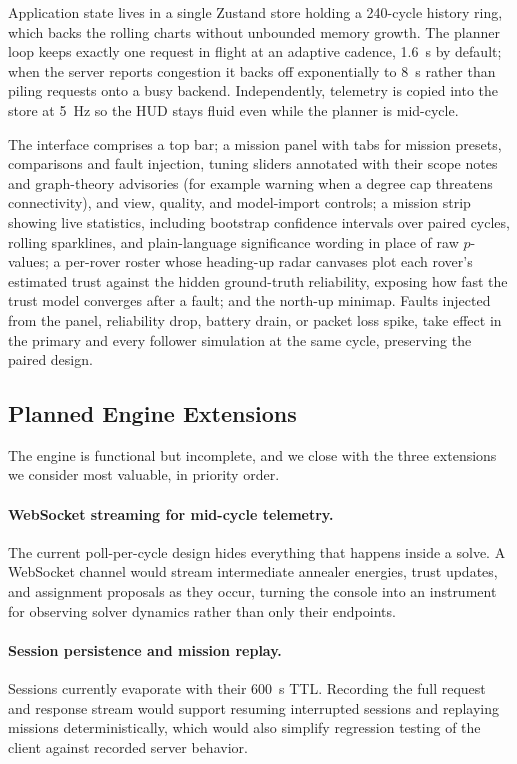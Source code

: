 Application state lives in a single Zustand store holding a 240-cycle
history ring, which backs the rolling charts without unbounded memory
growth. The planner loop keeps exactly one request in flight at an
adaptive cadence, 1.6~s by default; when the server reports congestion it
backs off exponentially to 8~s rather than piling requests onto a busy
backend. Independently, telemetry is copied into the store at 5~Hz so the
HUD stays fluid even while the planner is mid-cycle.

The interface comprises a top bar; a mission panel with tabs for mission
presets, comparisons and fault injection, tuning sliders annotated with
their scope notes and graph-theory advisories (for example warning when a
degree cap threatens connectivity), and view, quality, and model-import
controls; a mission strip showing live statistics, including bootstrap
confidence intervals over paired cycles, rolling sparklines, and
plain-language significance wording in place of raw $p$-values; a
per-rover roster whose heading-up radar canvases plot each rover's
estimated trust against the hidden ground-truth reliability, exposing how
fast the trust model converges after a fault; and the north-up minimap.
Faults injected from the panel, reliability drop, battery drain, or packet
loss spike, take effect in the primary and every follower simulation at
the same cycle, preserving the paired design.


\subsection{Planned Engine Extensions}

The engine is functional but incomplete, and we close with the three
extensions we consider most valuable, in priority order.

\paragraph{WebSocket streaming for mid-cycle telemetry.}
The current poll-per-cycle design hides everything that happens inside a
solve. A WebSocket channel would stream intermediate annealer energies,
trust updates, and assignment proposals as they occur, turning the console
into an instrument for observing solver dynamics rather than only their
endpoints.

\paragraph{Session persistence and mission replay.}
Sessions currently evaporate with their 600~s TTL. Recording the full
request and response stream would support resuming interrupted sessions
and replaying missions deterministically, which would also simplify
regression testing of the client against recorded server behavior.


